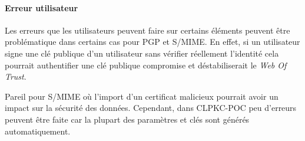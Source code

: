 \paragraph*{Erreur utilisateur}
Les erreurs que les utilisateurs peuvent faire sur certains éléments peuvent être problématique dans certains cas pour PGP et S/MIME. En effet, si un utilisateur signe une clé publique d'un utilisateur sans vérifier réellement l'identité cela pourrait authentifier une clé publique compromise et déstabiliserait le \textit{Web Of Trust}.

 Pareil pour S/MIME où l'import d'un certificat malicieux pourrait avoir un impact sur la sécurité des données. Cependant, dans CLPKC-POC peu d'erreurs peuvent être faite car la plupart des paramètres et clés sont générés automatiquement.